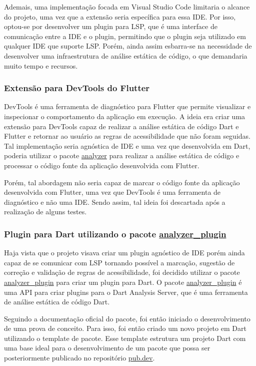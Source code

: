 Ademais, uma implementação focada em Visual Studio Code limitaria o alcance do projeto, uma vez que a extensão seria específica para essa IDE. Por isso, optou-se por desenvolver um plugin para LSP, que é uma interface de comunicação entre a IDE e o plugin, permitindo que o plugin seja utilizado em qualquer IDE que suporte LSP. Porém, ainda assim esbarra-se na necessidade de desenvolver uma infraestrutura de análise estática de código, o que demandaria muito tempo e recursos.

\subsubsection{Extensão para DevTools do Flutter}

DevTools é uma ferramenta de diagnóstico para Flutter que permite visualizar e inspecionar o comportamento da aplicação em execução. A ideia era criar uma extensão para DevTools capaz de realizar a análise estática de código Dart e Flutter e retornar ao usuário as regras de acessibilidade que não foram seguidas. Tal implementação seria agnóstica de IDE e uma vez que desenvolvida em Dart, poderia utilizar o pacote \href{https://pub.dev/packages/analyzer}{analyzer} para realizar a análise estática de código e processar o código fonte da aplicação desenvolvida com Flutter.

Porém, tal abordagem não seria capaz de marcar o código fonte da aplicação desenvolvida com Flutter, uma vez que DevTools é uma ferramenta de diagnóstico e não uma IDE. Sendo assim, tal ideia foi descartada após a realização de alguns testes.

\subsubsection{Plugin para Dart utilizando o pacote \href{https://pub.dev/packages/analyzer_plugin}{analyzer\_plugin}}

Haja vista que o projeto visava criar um plugin agnóstico de IDE porém ainda capaz de se comunicar com LSP tornando possível a marcação, sugestão de correção e validação de regras de acessibilidade, foi decidido utilizar o pacote \href{https://pub.dev/packages/analyzer_plugin}{analyzer\_plugin} para criar um plugin para Dart. O pacote \href{https://pub.dev/packages/analyzer_plugin}{analyzer\_plugin} é uma API para criar plugins para o Dart Analysis Server, que é uma ferramenta de análise estática de código Dart.

Seguindo a documentação oficial do pacote, foi então iniciado o desenvolvimento de uma prova de conceito. Para isso, foi então criado um novo projeto em Dart utilizando o template de pacote. Esse template estrutura um projeto Dart com uma base ideal para o desenvolvimento de um pacote que possa ser posteriormente publicado no repositório \href{https://pub.dev}{pub.dev}.

